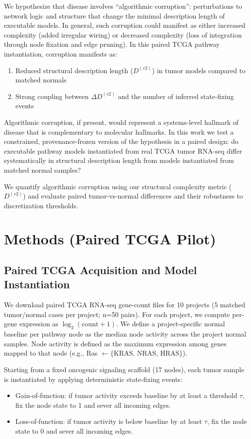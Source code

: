\documentclass[11pt]{article}
\begin{document}
We hypothesize that disease involves ``algorithmic corruption'': perturbations to network logic and structure that change the minimal description length of executable models. In general, such corruption could manifest as either increased complexity (added irregular wiring) or decreased complexity (loss of integration through node fixation and edge pruning). In this paired TCGA pathway instantiation, corruption manifests as:
\begin{enumerate}
    \item Reduced structural description length ($D^{(v2)}$) in tumor models compared to matched normals
    \item Strong coupling between $\Delta D^{(v2)}$ and the number of inferred state-fixing events
\end{enumerate}

Algorithmic corruption, if present, would represent a systems-level hallmark of disease that is complementary to molecular hallmarks\cite{Hanahan2011}. In this work we test a constrained, provenance-frozen version of the hypothesis in a paired design: do executable pathway models instantiated from real TCGA tumor RNA-seq differ systematically in structural description length from models instantiated from matched normal samples?

We quantify algorithmic corruption using our structural complexity metric ($D^{(v2)}$) and evaluate paired tumor-vs-normal differences and their robustness to discretization thresholds.

\section*{Methods (Paired TCGA Pilot)}

\subsection*{Paired TCGA Acquisition and Model Instantiation}

We download paired TCGA RNA-seq gene-count files for 10 projects (5 matched tumor/normal cases per project; n=50 pairs). For each project, we compute per-gene expression as $\log_2(\mathrm{count}+1)$. We define a project-specific normal baseline per pathway node as the median node activity across the project normal samples. Node activity is defined as the maximum expression among genes mapped to that node (e.g., Ras $\leftarrow\{\text{KRAS, NRAS, HRAS}\}$).

Starting from a fixed oncogenic signaling scaffold (17 nodes), each tumor sample is instantiated by applying deterministic state-fixing events:
\begin{itemize}
    \item Gain-of-function: if tumor activity exceeds baseline by at least a threshold $\tau$, fix the node state to 1 and sever all incoming edges.
    \item Loss-of-function: if tumor activity is below baseline by at least $\tau$, fix the node state to 0 and sever all incoming edges.
\end{itemize}
\end{document}
